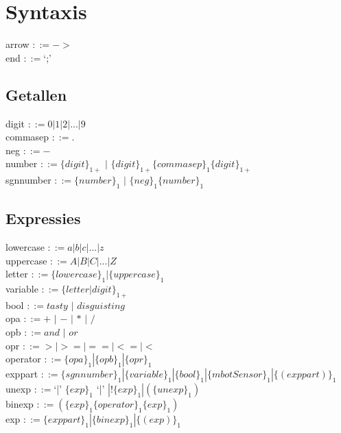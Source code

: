 \documentclass[12pt,a4paper]{report}
\begin{document}
\chapter{Syntaxis}
arrow $::= ->$\\
end $::= $`;'\\
\section{Getallen}
digit $::= 0|1|2|...|9$\\
commasep $::= .$\\
neg $::= -$\\
number $::= \{digit\}_{1+}$ $|$ $\{digit\}_{1+}\{commasep\}_{1}\{digit\}_{1+}$\\
sgnnumber $::= \{number\}_{1}$ $|$ $\{neg\}_{1}\{number\}_{1}$\\

\section{Expressies}
lowercase $::= a|b|c|...|z$\\
uppercase $::= A|B|C|...|Z$\\
letter $::= \{lowercase\}_{1} | \{uppercase\}_{1}$\\
variable $::= \{letter|digit\}_{1+}$\\
bool $::= tasty$ $|$ $disguisting$\\
opa $::= +$ $|$ $-$ $|$ $*$ $|$ $/$\\
opb $::= and$ $|$ $or$\\
opr $::= >|>=|==|<=|<$\\
operator $::= \{opa\}_{1} | \{opb\}_{1} | \{opr\}_{1}$\\
exppart $::= \{sgnnumber\}_{1} | \{variable\}_{1} | \{bool\}_{1} | \{mbotSensor\}_{1} | \{(exppart)\}_{1}$\\
unexp $::= $`|' $\{exp\}_{1}$ `|' $| !\{exp\}_{1} | (\{unexp\}_{1})$\\
binexp $::= (\{exp\}_{1} \{operator\}_{1} \{exp\}_{1})$\\
exp $::= \{exppart\}_{1} | \{binexp\}_{1} | \{(exp)\}_{1}$\\
\end{document}
